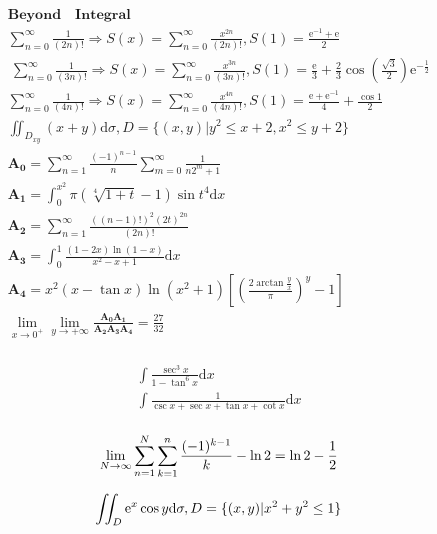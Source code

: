 \documentclass{article}
\begin{document}
\clearpage

\begin{align*}
    \bm{Beyond \quad Integral} \\
    \sum_{n=0}^\infty \frac{1}{(2n)!} \Longrightarrow S(x) = \sum_{n=0}^{\infty}{\frac{x^{2n}}{(2n)!}} ,S(1) = \frac{\mathrm{e}^{-1}+\mathrm{e}}{2}\\\ 
    \sum_{n=0}^\infty \frac{1}{(3n)!} \Longrightarrow S(x) = \sum_{n=0}^{\infty}{\frac{x^{3n}}{(3n)!}} ,S(1) = \frac{\mathrm{e}}{3}+\frac{2}{3}\cos\left(\frac{\sqrt{3}}{2}\right)\mathrm{e}^{-\frac{1}{2}} \\ 
    \sum_{n=0}^{\infty} \frac{1}{(4n)!} \Longrightarrow S(x) = \sum_{n=0}^{\infty}{\frac{x^{4n}}{(4n)!}} ,S(1) = \frac{\mathrm{e}+\mathrm{e}^{-1}}{4}+\frac{\cos 1}{2} \\
    \iint_{D_{xy}} (x+y)\mathrm{d}\sigma , D=\{(x,y)|y^2 \le x+2, x^2 \le y+2\} \\
    \bm{A_{0}} = \sum_{n=1}^\infty\frac{(-1)^{n-1}}{n}\sum_{m=0}^\infty\frac{1}{n2^m+1} \\
    \bm{A_{1}} = \int_{0}^{x^2} \pi(\sqrt[4]{1+t}-1)\sin t^4 \mathrm{d}x\\ 
    \bm{A_{2}} = \sum_{n=1}^\infty \frac{((n-1)!)^2(2t)^{2n}}{(2n)!} \\
    \bm{A_{3}} = \int_{0}^1\frac{(1-2x)\ln(1-x)}{x^2-x+1}\mathrm{d}x\\
    \bm{A_{4}} = x^2(x-\tan x)\ln(x^2+1)[\left(\frac{2\arctan \frac{y}{x}}{\pi}\right)^y-1] \\ 
    \lim_{x \to 0^{+}} \lim_{y \to +\infty}\frac{\bm{A_{0}}\bm{A_{1}}}{\bm{A_{2}}\bm{A_{3}}\bm{A_{4}}} = \frac{27}{32}\\
\end{align*}

\begin{align*}
    \int\frac{\sec^3 x}{1-\tan^6 x}\mathrm{d}x \\
    \int\frac{1}{\csc x+\sec x+\tan x +\cot x}\mathrm{d}x \\ 
\end{align*}

\clearpage
\begin{displaymath}
    \lim_{N \to \infty}\sum_{n=1}^N\sum_{k=1}^n\frac{(-1)^{k-1}}{k}-\ln 2  = \ln 2-\frac{1}{2} \newline 
\end{displaymath}

\begin{displaymath}
    \iint_{D}\mathrm{e}^{x}\cos y\mathrm{d}\sigma, D=\{(x,y)|x^2+y^2 \le 1\} \\  
\end{displaymath}
\end{document}
